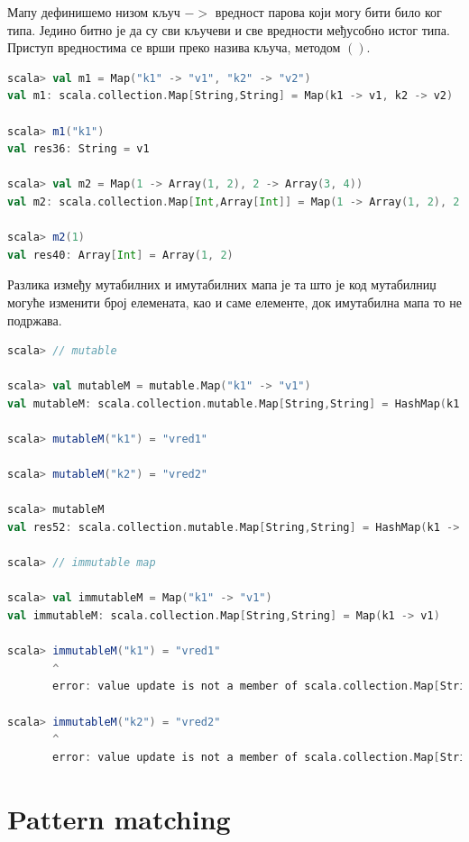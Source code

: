 \documentclass[12pt,oneside]{memoir}
\begin{document}
Мапу дефинишемо низом кључ $->$ вредност парова који могу бити било ког типа. Једино битно је да су сви кључеви и све вредности међусобно истог типа. Приступ вредностима се врши преко назива кључа, методом $()$.

\begin{lstlisting}[language=Scala]
scala> val m1 = Map("k1" -> "v1", "k2" -> "v2")
val m1: scala.collection.Map[String,String] = Map(k1 -> v1, k2 -> v2)

scala> m1("k1")
val res36: String = v1

scala> val m2 = Map(1 -> Array(1, 2), 2 -> Array(3, 4))
val m2: scala.collection.Map[Int,Array[Int]] = Map(1 -> Array(1, 2), 2 -> Array(3, 4))

scala> m2(1)
val res40: Array[Int] = Array(1, 2)
\end{lstlisting}

Разлика између мутабилних и имутабилних мапа је та што је код мутабилниџ могуће изменити број елемената, као и саме елементе, док имутабилна мапа то не подржава.

\begin{lstlisting}[language=Scala]
scala> // mutable

scala> val mutableM = mutable.Map("k1" -> "v1")
val mutableM: scala.collection.mutable.Map[String,String] = HashMap(k1 -> v1)

scala> mutableM("k1") = "vred1"

scala> mutableM("k2") = "vred2"

scala> mutableM
val res52: scala.collection.mutable.Map[String,String] = HashMap(k1 -> vred1, k2 -> vred2)

scala> // immutable map

scala> val immutableM = Map("k1" -> "v1")
val immutableM: scala.collection.Map[String,String] = Map(k1 -> v1)

scala> immutableM("k1") = "vred1"
       ^
       error: value update is not a member of scala.collection.Map[String,String]

scala> immutableM("k2") = "vred2"
       ^
       error: value update is not a member of scala.collection.Map[String,String]

\end{lstlisting}


\section{Pattern matching}
\label{sec:scala_patt_match}
\end{document}
